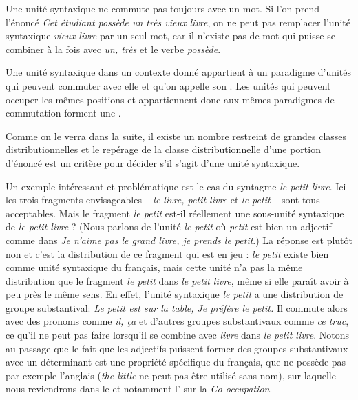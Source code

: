 Une unité syntaxique ne commute pas toujours avec un mot. Si l’on prend l’énoncé \textit{Cet étudiant possède un très vieux livre}, on ne peut pas remplacer l’unité syntaxique \textit{vieux livre} par un seul mot, car il n’existe pas de mot qui puisse se combiner à la fois avec \textit{un, très} et le verbe \textit{possède}.\largerpage

{Une unité syntaxique dans un contexte donné appartient à un paradigme d’unités qui peuvent commuter avec elle et qu’on appelle son . Les unités qui peuvent occuper les mêmes positions et appartiennent donc aux mêmes paradigmes de commutation forment une .}

Comme on le verra dans la suite, il existe un nombre restreint de grandes classes distributionnelles et le repérage de la classe distributionnelle d’une portion d’énoncé est un critère pour décider s’il s’agit d’une unité syntaxique.

Un exemple intéressant et problématique est le cas du syntagme \textit{le petit livre}. Ici les trois fragments envisageables – \textit{le livre, petit livre} et \textit{le petit} – sont tous acceptables. Mais le fragment \textit{le petit} est-il réellement une sous-unité syntaxique de \textit{le petit livre} ? (Nous parlons de l’unité \textit{le petit} où \textit{petit} est bien un adjectif comme dans \textit{Je n’aime pas le grand livre, je prends le petit}.) La réponse est plutôt non et c’est la distribution de ce fragment qui est en jeu : \textit{le petit} existe bien comme unité syntaxique du français, mais cette unité n’a pas la même distribution que le fragment \textit{le petit} dans \textit{le petit livre}, même si elle paraît avoir à peu près le même sens. En effet, l’unité syntaxique \textit{le petit} a une distribution de groupe substantival: \textit{Le petit est sur la table, Je préfère le petit.} Il commute alors avec des pronoms comme \textit{il, ça} et d’autres groupes substantivaux comme \textit{ce truc}, ce qu’il ne peut pas faire lorsqu’il se combine avec \textit{livre} dans \textit{le petit livre}. Notons au passage que le fait que les adjectifs puissent former des groupes substantivaux avec un déterminant est une propriété spécifique du français, que ne possède pas par exemple l’anglais (\textit{the little} ne peut pas être utilisé sans nom), sur laquelle nous reviendrons dans le  et notamment l’ sur la \textit{Co-occupation}.

